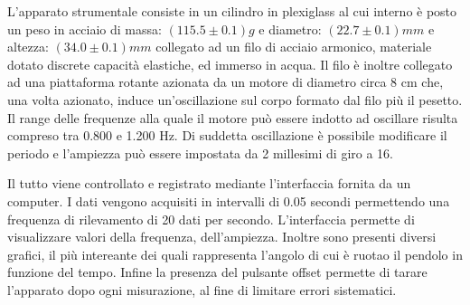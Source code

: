 L’apparato strumentale consiste in un cilindro in plexiglass al cui interno è posto un peso in acciaio di massa: $(115.5 \pm 0.1) g$
 e diametro: $(22.7 \pm 0.1)mm$ e altezza: $(34.0 \pm 0.1)mm$ collegato ad un filo di acciaio armonico, materiale dotato discrete
 capacità elastiche, ed immerso in acqua. Il filo è inoltre collegato ad una piattaforma rotante azionata da un motore di
 diametro circa 8 cm che, una volta azionato, induce un’oscillazione sul corpo formato dal filo più il pesetto. Il range delle
 frequenze alla quale il motore può essere indotto ad oscillare risulta compreso tra 0.800 e 1.200 Hz. Di suddetta oscillazione è
 possibile modificare il periodo e l’ampiezza può essere impostata da 2 millesimi di giro a 16. 
 
 Il tutto viene controllato e
 registrato mediante l’interfaccia fornita da un computer. I dati vengono acquisiti in intervalli di 0.05 secondi 
 permettendo una frequenza di rilevamento di 20 dati per secondo.
 L’interfaccia permette di visualizzare valori della frequenza, dell’ampiezza. Inoltre sono presenti
 diversi grafici, il più intereante dei quali rappresenta l'angolo di cui è ruotao il pendolo in funzione del tempo. Infine la
 presenza del pulsante offset permette di tarare l’apparato dopo ogni misurazione, al fine di limitare errori sistematici.


